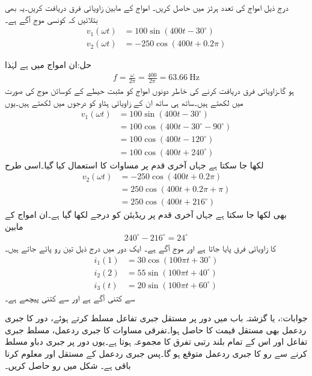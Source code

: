درج ذیل امواج کی تعدد ہرٹز میں حاصل کریں۔ امواج کے مابین زاویائی فرق دریافت کریں۔یہ بھی بتلائیں کہ کونسی موج آگے ہے۔
\begin{align*}
v_1(\omega t)&=100\sin(400t -30^{\circ})\\
v_2(\omega t)&=-250\cos(400t+0.2\pi)
\end{align*}

حل:ان امواج میں  ہے لہٰذا
\begin{align*}
f=\frac{\omega}{2\pi}=\frac{400}{2\pi}=\SI{63.66}{\hertz}
\end{align*}
ہو گا۔زاویائی فرق دریافت کرنے کی خاطر دونوں امواج کو مثبت حیطے کے کوسائن موج کی صورت میں لکھتے ہیں۔ساتھ ہی ساتھ ان کے زاویائی ہٹاو کو درجوں میں لکھتے ہیں۔یوں
\begin{align*}
v_1(\omega t)&=100\sin(400t -30^{\circ})\\
&=100\cos(400t-30^{\circ}-90^{\circ})\\
&=100\cos(400t-120^{\circ})\\
&=100\cos(400t+240^{\circ})
\end{align*}
لکھا جا سکتا ہے جہاں آخری قدم پر مساوات  کا استعمال کیا گیا۔اسی طرح
\begin{align*}
v_2(\omega t)&=-250\cos(400t+0.2\pi)\\
&=250\cos(400t+0.2\pi+\pi)\\
&=250\cos(400t+216^{\circ})
\end{align*}
بھی لکھا جا سکتا ہے جہاں آخری قدم پر  ریڈیئن کو  درجے لکھا گیا ہے۔ان امواج کے مابین
\begin{align*}
240^{\circ}-216^{\circ}=24^{\circ}
\end{align*}
کا زاویائی فرق پایا جاتا ہے اور موج  آگے ہے۔
ایک دور میں درج ذیل تین رو پائے جاتے ہیں۔
\begin{align*}
i_1(1)&=30\cos(100\pi t+30^{\circ})\\
i_2(2)&=55\sin(100\pi t +40^{\circ})\\
i_3(t)&=20\sin(100 \pi t+60^{\circ})
\end{align*}
 سے  کتنی آگے ہے اور  سے  کتنی پیچھے ہے۔

جوابات:،  یا  
گزشتہ باب میں دور پر مستقل جبری تفاعل مسلط  کرتے ہوئے، دور کا جبری ردعمل بھی مستقل قیمت کا حاصل ہوا۔تفرقی مساوات کا جبری ردعمل، مسلط جبری تفاعل اور اس کے تمام بلند رتبی تفرق کا مجموعہ ہوتا ہے۔یوں  دور پر جبری دباو  مسلط کرنے سے رو کا جبری ردعمل  متوقع ہو گا۔پس جبری ردعمل کے مستقل  اور  معلوم کرنا باقی ہے۔
شکل  میں رو  حاصل کریں۔

